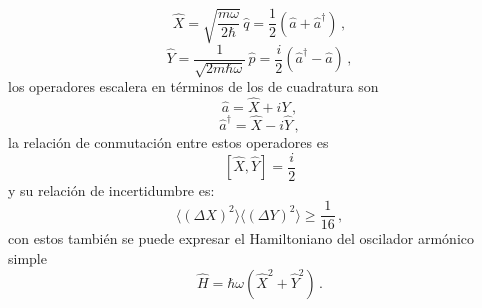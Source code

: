 \begin{equation}
\label{OA.23}
\hat{X} = \sqrt{\frac{m\omega}{2\hbar}} \, \hat{q} = \frac{1}{2}\left( \hat{a} + \hat{a}^{\dagger} \right)\,,
\end{equation}
\begin{equation}
\label{OA.24}
\hat{Y} = \frac{1}{\sqrt{2m\hbar\omega}} \, \hat{p} = \frac{i}{2}\left( \hat{a}^{\dagger} - \hat{a} \right)\,,
\end{equation}
los operadores escalera en términos de los de cuadratura son
\begin{equation}
\label{OA.25}	
\hat{a} = \hat{X} + i{Y}\,,
\end{equation}
\begin{equation}
\label{OA.26}
\hat{a}^{\dagger} = \hat{X} - i\hat{Y}\,,
\end{equation}
la relación de conmutación entre estos operadores es
\begin{equation}
\label{OA.27}
\left[ \hat{X}, \hat{Y} \right] = \frac{i}{2}
\end{equation}
y su relación de incertidumbre es:
\begin{equation}
\label{OA.28}
\langle (\Delta X)^2 \rangle \langle (\Delta Y)^2 \rangle \geq \frac{1}{16}\,,
\end{equation}
con estos también se puede expresar el Hamiltoniano del oscilador armónico simple
\begin{equation}
\label{OA.29}
\hat{H} = \hbar \omega \left( \hat{X}^2 + \hat{Y}^2 \right)\,.
\end{equation}
